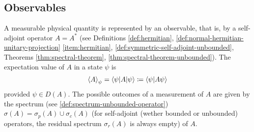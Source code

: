 \subsection{Observables} \label{sec:observables}

A measurable physical quantity is represented by an observable, that is, by a self-adjoint operator
\(
A = A^*
\)
(see Definitions \ref{def:hermitian}, \ref{def:normal-hermitian-unitary-projection} \ref{item:hermitian}, \ref{def:symmetric-self-adjoint-unbounded}, Theorems \ref{thm:spectral-theorem}, \ref{thm:spectral-theorem-unbounded}).
The expectation value of $A$ in a state $\psi$ is
\begin{equation}\label{eq:expectation-value-observable}
\braket{A}_{\psi}
=
\braket{\psi | A | \psi}
\coloneq
\braket{\psi | A\psi}
\end{equation}
provided $\psi \in D(A)$.
The possible outcomes of a measurement of $A$ are given by the spectrum (see \autoref{def:spectrum-unbounded-operator}) $\sigma(A) = \sigma_p(A) \cup \sigma_c(A)$ (for self-adjoint (wether bounded or unbounded) operators, the residual spectrum $\sigma_r(A)$ is always empty) of $A$.


